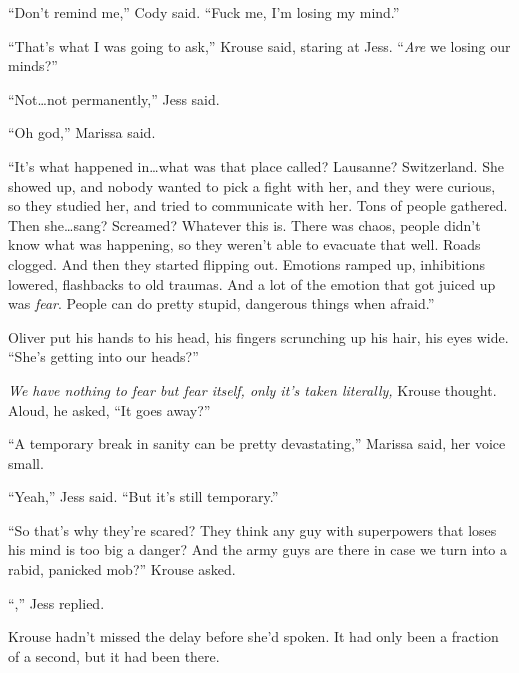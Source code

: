 ``Don't remind me,'' Cody said.  ``Fuck me, I'm losing my mind.''



``That's what I was going to ask,'' Krouse said, staring at Jess.  ``\emph{Are} we losing our minds?''



``Not\ldots not permanently,'' Jess said.



``Oh god,'' Marissa said.



``It's what happened in\ldots what was that place called?  Lausanne?  Switzerland.  She showed up, and nobody wanted to pick a fight with her, and they were curious, so they studied her, and tried to communicate with her.  Tons of people gathered.  Then she\ldots sang?  Screamed?  Whatever this is.  There was chaos, people didn't know what was happening, so they weren't able to evacuate that well.  Roads clogged.  And then they started flipping out.  Emotions ramped up, inhibitions lowered, flashbacks to old traumas.  And a lot of the emotion that got juiced up was \emph{fear}.  People can do pretty stupid, dangerous things when afraid.''



Oliver put his hands to his head, his fingers scrunching up his hair, his eyes wide.  ``She's getting into our heads?''



\emph{We have nothing to fear but fear itself, only it's taken literally, }Krouse thought.  Aloud, he asked, ``It goes away?''



``A temporary break in sanity can be pretty devastating,'' Marissa said, her voice small.



``Yeah,'' Jess said.  ``But it's still temporary.''



``So that's why they're scared?  They think any guy with superpowers that loses his mind is too big a danger?  And the army guys are there in case we turn into a rabid, panicked mob?''  Krouse asked.



``\ldotsYeah,'' Jess replied.



Krouse hadn't missed the delay before she'd spoken.  It had only been a fraction of a second, but it had been there.




